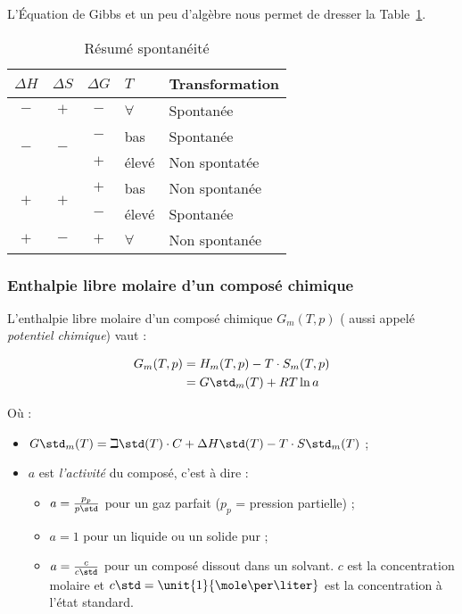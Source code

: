 
L'\'Equation de Gibbs et un peu d'algèbre nous permet de dresser la Table~\ref{tab:hsgt}.
\begin{table}[ht!]
  \begin{center}
    \begin{tabular}{|cccll|}
      \hline
      $\Delta H$ & $\Delta S$ & $\Delta G$ & $T$ & Transformation\\
      \hline
      $-$ & $+$ & $-$ & $\forall$ & Spontanée\\
      \hline
      \multirow{2}{*}{$-$} & \multirow{2}{*}{$-$} & $-$ & bas & Spontanée\\
                                    & & $+$ & élevé & Non spontatée\\
      \hline
      \multirow{2}{*}{$+$} & \multirow{2}{*}{$+$} & $+$ & bas & Non spontanée\\
                                    & & $-$ & élevé & Spontanée\\
      \hline
      $+$ & $-$ & $+$ & $\forall$ & Non spontanée\\
      \hline
    \end{tabular}
  \end{center}
  \caption{Résumé spontanéité}
  \label{tab:hsgt}
\end{table}

\subsubsection{Enthalpie libre molaire d'un composé chimique}
L'enthalpie libre molaire d'un composé chimique $G_m(T, p)$ (
aussi appelé \textit{potentiel chimique}) vaut :

\begin{align*}
		G_m(T, p) 	&= H_m(T, p) - T \cdot S_m(T, p) \\
								&= G\std_m(T) + RT \ln a
\end{align*}

Où :

\begin{itemize}
	\item $G\std_m(T) = \beth\std (T) \cdot C + \Delta H\std(T) - T \cdot S\std_m(T)$ ;
	\item $a$ est \textit{l'activité} du composé, c'est à dire : 
		\begin{itemize}
			\item	$a = \frac{p_p}{p\std}$ pour un gaz parfait ($p_p$ = pression partielle) ;
			\item $a = 1$ pour un liquide ou un solide pur ;
			\item $a = \frac{c}{c\std}$ pour un composé dissout dans un solvant. $c$ est
			la concentration molaire et $c\std = \unit{1}{\mole\per\liter}$ est la concentration
			à l'état standard.
		\end{itemize}
\end{itemize}

